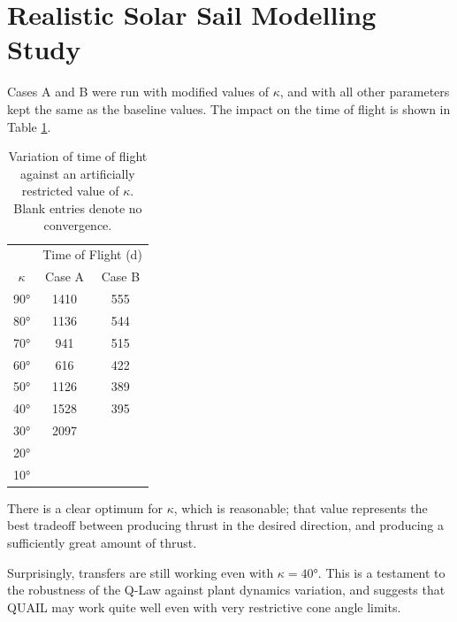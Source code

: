\section{Realistic Solar Sail Modelling Study}

Cases A and B were run with modified values of \(\kappa\), and with all other parameters kept the same as the baseline values. The impact on the time of flight is shown in Table \ref{tab:cone_angle_changing}.

\begin{table}[H]
    \centering
    \begin{tabular}{ccc}
        \toprule
                   & \multicolumn{2}{c}{Time of Flight (d)}          \\
        \(\kappa\) & Case A                                 & Case B \\
        \midrule
        \ang{90}   & 1410                                   & 555    \\
        \ang{80}   & 1136                                   & 544    \\
        \ang{70}   & 941                                    & 515    \\
        \ang{60}   & 616                                    & 422    \\
        \ang{50}   & 1126                                   & 389    \\
        \ang{40}   & 1528                                   & 395    \\
        \ang{30}   & 2097                                   &        \\
        \ang{20}   &                                        &        \\
        \ang{10}   &                                        &        \\
        \bottomrule
    \end{tabular}
    \caption{Variation of time of flight against an artificially restricted value of \(\kappa\). Blank entries denote no convergence.}
    \label{tab:cone_angle_changing}
\end{table}

There is a clear optimum for \(\kappa\), which is reasonable; that value represents the best tradeoff between producing thrust in the desired direction, and producing a sufficiently great amount of thrust.

Surprisingly, transfers are still working even with \(\kappa = \ang{40}\). This is a testament to the robustness of the Q-Law against plant dynamics variation, and suggests that QUAIL may work quite well even with very restrictive cone angle limits.


